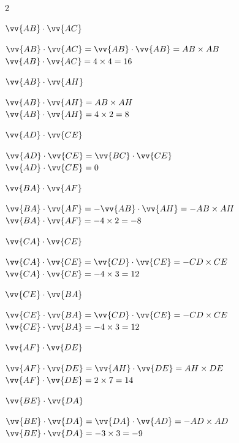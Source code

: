 \documentclass[12pt,a4paper]{article}  %
\begin{document}
	\begin{multicols}{2}
	\begin{enumMet}
		\item $ \vv{A B} \cdot  \vv{A C}$
		\begin{corrBox}
			$ \vv{A B} \cdot  \vv{A C}= \vv{A B} \cdot  \vv{A B}=AB\times AB$\\ 
			$ \vv{A B} \cdot  \vv{A C}= 4\times4=16$
		\end{corrBox}
		\item $ \vv{A B} \cdot  \vv{A H}$
		\begin{corrBox}
			$ \vv{A B} \cdot  \vv{A H}= AB\times AH$\\ 
			$ \vv{A B} \cdot  \vv{A H}= 4\times2=8$
		\end{corrBox}
		\item $ \vv{A D} \cdot  \vv{C E}$
		\begin{corrBox}
			$ \vv{A D} \cdot  \vv{CE}= \vv{BC} \cdot  \vv{CE}$\\ 
			$ \vv{A D} \cdot  \vv{CE}= 0$
		\end{corrBox}
		\item $ \vv{B A} \cdot  \vv{A F}$
		\begin{corrBox}
			$ \vv{BA} \cdot  \vv{AF}= -\vv{A B} \cdot  \vv{A H}=-AB\times AH$\\ 
			$ \vv{BA} \cdot  \vv{AF}= -4\times2=-8$
		\end{corrBox}
	
		\columnbreak
		\item $ \vv{C A} \cdot  \vv{C E}$
		\begin{corrBox}
			$ \vv{CA} \cdot  \vv{CE}= \vv{CD} \cdot  \vv{CE}=-CD\times CE$\\ 
			$ \vv{CA} \cdot  \vv{CE}=- 4\times3=12$
		\end{corrBox}
		\item $ \vv{C E} \cdot  \vv{B A}$
		\begin{corrBox}
			$ \vv{CE} \cdot  \vv{BA}= \vv{CD} \cdot  \vv{CE}=-CD\times CE$\\ 
			$ \vv{CE} \cdot  \vv{BA}= -4\times3=12$
		\end{corrBox}
		\item $ \vv{A F} \cdot  \vv{D E}$
		\begin{corrBox}
			$ \vv{A F} \cdot  \vv{DE}= \vv{AH} \cdot  \vv{DE}=AH\times DE$\\ 
			$ \vv{AF} \cdot  \vv{DE}= 2\times7=14$
		\end{corrBox}
		\item $ \vv{B E} \cdot  \vv{D A}$
		\begin{corrBox}
			$ \vv{BE} \cdot  \vv{DA}= \vv{DA} \cdot  \vv{AD}=-AD\times AD$\\ 
			$ \vv{BE} \cdot  \vv{DA}= -3\times3=-9$
		\end{corrBox}
	\end{enumMet}
	\end{multicols}

%	
%
\end{document}
